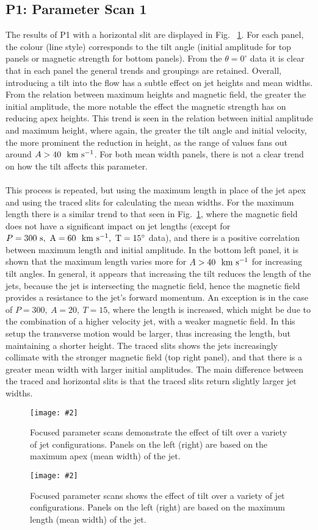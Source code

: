 \documentclass[12pt]{ociamthesis}
\newcommand{\mfig}[4]{
  \begin{figure}
  \begin{center}
  \texttt{[image: \#2]}
  \caption{#3}
  \label{#4}
  \end{center}
  \end{figure}}
\newcommand{\kms}{~\rm{km ~s^{-1}}}
\newcommand{\np}{\\ \\}
\begin{document}
\subsection{P1: Parameter Scan 1}
\label{subsec:pscansII_I}
The results of P1 with a horizontal slit are displayed in Fig. ~\ref{p_scan_t_apex}. For each panel, the colour (line style) corresponds to the tilt angle (initial amplitude for top panels or magnetic strength for bottom panels). From the $\theta=0^{\circ}$ data it is clear that in each panel the general trends and groupings are retained. Overall, introducing a tilt into the flow has a subtle effect on jet heights and mean widths. From the relation between maximum heights and magnetic field, the greater the initial amplitude, the more notable the effect the magnetic strength has on reducing apex heights. This trend is seen in the relation between initial amplitude and maximum height, where again, the greater the tilt angle and initial velocity, the more prominent the reduction in height, as the range of values fans out around $A>40~\kms$. For both mean width panels, there is not a clear trend on how the tilt affects this parameter. \np
%
This process is repeated, but using the maximum length in place of the jet apex and using the traced slits for calculating the mean widths. For the maximum length there is a similar trend to that seen in Fig.~\ref{p_scan_t_apex}, where the magnetic field does not have a significant impact on jet lengths (except for $P=300~\rm{s},~A=60~\kms,~T=15^{\circ}$ data), and there is a positive correlation between maximum length and initial amplitude. In the bottom left panel, it is shown that the maximum length varies more for $A>40~\kms$ for increasing tilt angles. In general, it appears that increasing the tilt reduces the length of the jets, because the jet is intersecting the magnetic field, hence the magnetic field provides a resistance to the jet's forward momentum. An exception is in the case of $P=300,~A=20,~T=15$, where the length is increased, which might be due to the combination of a higher velocity jet, with a weaker magnetic field. In this setup the transverse motion would be larger, thus increasing the length, but maintaining a shorter height. The traced slits shows the jets increasingly collimate with the stronger magnetic field (top right panel), and that there is a greater mean width with larger initial amplitudes. The main difference between the traced and horizontal slits is that the traced slits return slightly larger jet widths.
\mfig{1}{figures/horizontal_slit_pscan_fixing.png}{Focused parameter scans demonstrate the effect of tilt over a variety of jet configurations. Panels on the left (right) are based on the maximum apex (mean width) of the jet.}{p_scan_t_apex}
%
\mfig{1}{figures/traced_slit_pscan_fixing.png}{Focused parameter scans shows the effect of tilt over a variety of jet configurations. Panels on the left (right) are based on the maximum length (mean width) of the jet.}{p_scan_t_len}
\end{document}
